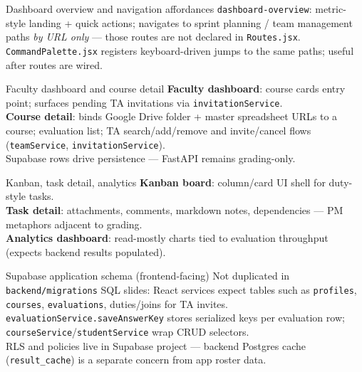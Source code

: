 \documentclass[aspectratio=169]{beamer}
\begin{document}
\begin{frame}{Dashboard overview and navigation affordances}
  \small
  \texttt{dashboard-overview}: metric-style landing + quick actions; navigates to sprint planning / team management paths \emph{by URL only} --- those routes are not declared in \texttt{Routes.jsx}.\\
  \texttt{CommandPalette.jsx} registers keyboard-driven jumps to the same paths; useful after routes are wired.
\end{frame}

\begin{frame}{Faculty dashboard and course detail}
  \small
  \textbf{Faculty dashboard}: course cards entry point; surfaces pending TA invitations via \texttt{invitationService}.\\
  \textbf{Course detail}: binds Google Drive folder + master spreadsheet URLs to a course; evaluation list; TA search/add/remove and invite/cancel flows (\texttt{teamService}, \texttt{invitationService}).\\
  Supabase rows drive persistence --- FastAPI remains grading-only.
\end{frame}

\begin{frame}{Kanban, task detail, analytics}
  \small
  \textbf{Kanban board}: column/card UI shell for duty-style tasks.\\
  \textbf{Task detail}: attachments, comments, markdown notes, dependencies --- PM metaphors adjacent to grading.\\
  \textbf{Analytics dashboard}: read-mostly charts tied to evaluation throughput (expects backend results populated).
\end{frame}

\begin{frame}{Supabase application schema (frontend-facing)}
  \tiny
  Not duplicated in \texttt{backend/migrations} SQL slides: React services expect tables such as \texttt{profiles}, \texttt{courses}, \texttt{evaluations}, duties/joins for TA invites.\\
  \texttt{evaluationService.saveAnswerKey} stores serialized keys per evaluation row; \texttt{courseService}/\texttt{studentService} wrap CRUD selectors.\\
  RLS and policies live in Supabase project --- backend Postgres cache (\texttt{result\_cache}) is a separate concern from app roster data.
\end{frame}
\end{document}
